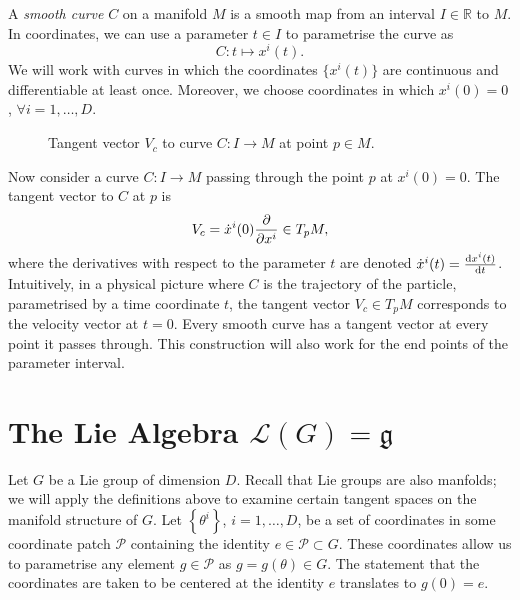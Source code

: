 
\begin{definition}
  A \emph{smooth curve} $C$ on a manifold $M$ is a smooth map from an interval $I \in \mathbb{R}$ to $M$.
  In coordinates, we can use a parameter $t \in I$ to parametrise the curve as
  \begin{equation}
    C\colon t \mapsto x^i(t).
  \end{equation}
  We will work with curves in which the coordinates $\{ x^i (t) \}$ are continuous and differentiable at least once.
  Moreover, we choose coordinates in which $x^i(0) = 0$, $\forall i = 1, \ldots, D$.
\end{definition}

\begin{figure}[htpb]
  \centering
  \def\svgwidth{0.3\columnwidth}
  
  \caption{Tangent vector $V_c$ to curve $C\colon I \to M$ at point $p \in M$.}
  \label{fig:tangentcurve}
\end{figure}
Now consider a curve $C\colon I \to M$ passing through the point $p$ at $x^i(0) = 0$. The tangent vector to $C$ at $p$ is
\begin{equation}
  V_c = \dot x^i(0) \pdv{}{x^i} \in T_p M,
\end{equation}
where the derivatives with respect to the parameter $t$ are denoted $\dot x^i(t) = \dv{x^i(t)}{t}$.
Intuitively, in a physical picture where $C$ is the trajectory of the particle, parametrised by a time coordinate $t$, the tangent vector $V_c \in T_p M$ corresponds to the velocity vector at $t = 0$.
Every smooth curve has a tangent vector at every point it passes through.
This construction will also work for the end points of the parameter interval.

\section{The Lie Algebra \texorpdfstring{$\mathscr{L}(G) = \mathfrak{g}$}{of group G}}%
\label{sec:the_lie_algebra_of_G}

Let $G$ be a Lie group of dimension $D$. Recall that Lie groups are also manfolds; we will apply the definitions above to examine certain tangent spaces on the manifold structure of $G$. Let $\left\{ \theta^i \right\}$, $i = 1, \ldots, D$, be a set of coordinates in some coordinate patch $\mathcal{P}$ containing the identity $e \in \mathcal{P} \subset G$.
These coordinates allow us to parametrise any element $g \in \mathcal{P}$ as $g = g(\theta) \in G$. The statement that the coordinates are taken to be centered at the identity $e$ translates to $g(0) = e$.

